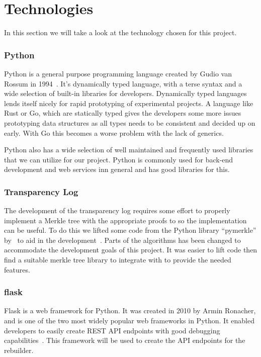 \documentclass[../Main/thesis.tex]{subfiles}
\begin{document}
\chapter{Technologies}\label{ch:technologies}
In this section we will take a look at the technology chosen for this project.

\subsection*{Python}
Python is a general purpose programming language created by Gudio van Rossum in
1994~\cite{python}. It's dynamically typed language, with a terse syntax and a wide selection
of built-in libraries for developers. Dynamically typed languages lends itself
nicely for rapid prototyping of experimental projects. A language like Rust or
Go, which are statically typed gives the developers some more issues prototyping
data structures as all types needs to be consistent and decided up on early.
With Go this becomes a worse problem with the lack of generics.

Python also has a wide selection of well maintained and frequently used
libraries that we can utilize for our project. Python is commonly used for
back-end development and web services inn general and has good libraries for
this.

\subsection*{Transparency Log}%
\label{sub:transparency_log_library}
The development of the transparency log requires some effort to properly
implement a Merkle tree with the appropriate proofs to so the implementation can
be useful. To do this we lifted some code from the Python library ``pymerkle''
by~\citeauthor{pymerkeltools} to aid in the development~\cite{pymerkeltools}.
Parts of the algorithms has been changed to accommodate the development goals of
this project. It was easier to lift code then find a suitable merkle tree
library to integrate with to provide the needed features.

\subsection*{flask}
Flask is a web framework for Python. It was created in 2010 by Armin Ronacher,
and is one of the two most widely popular web frameworks in Python. It enabled
developers to easily create REST API endpoints with good debugging
capabilities~\cite{flask}. This framework will be used to create the API
endpoints for the rebuilder.
\end{document}
